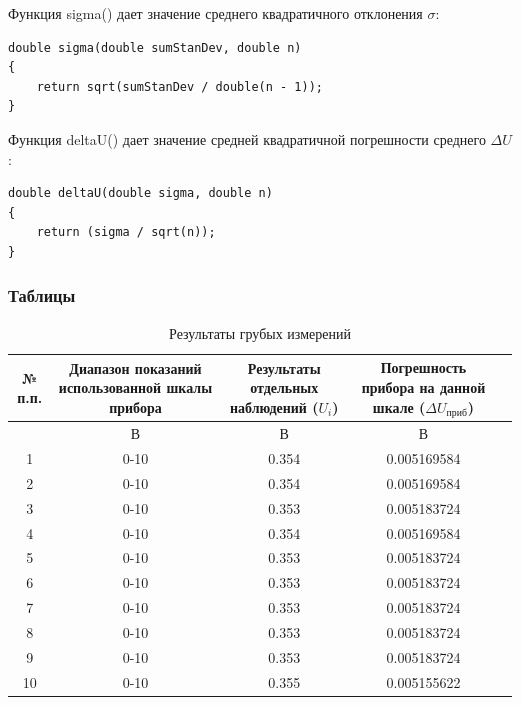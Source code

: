 Функция sigma() дает значение среднего квадратичного отклонения $\sigma$:
\begin{verbatim}
double sigma(double sumStanDev, double n)
{
	return sqrt(sumStanDev / double(n - 1));
}
\end{verbatim}

Функция deltaU() дает значение средней квадратичной
погрешности среднего $\Delta U$:
\begin{verbatim}
double deltaU(double sigma, double n)
{
	return (sigma / sqrt(n));
}
\end{verbatim}

\subsubsection{Таблицы}

\begin{center}
\begin{table}[h!]
\centering
\caption{Результаты грубых измерений}
\label{tabl:1}
\begin{tabular}{|c|c|c|c|c|}
\hline
\begin{minipage}{7mm}
    № п.п. 
\end{minipage}&
\begin{minipage}{5cm}
    Диапазон показаний использованной шкалы прибора
\end{minipage} &
\begin{minipage}{5cm}
    Результаты отдельных наблюдений ($U_i$)
\end{minipage} &
\begin{minipage}{5cm}
    Погрешность прибора на данной шкале ($\Delta U_{\text{приб}}$)
\end{minipage}\\
\hline
{}&В&В&В\\
\hline
1 &	0-10  &	0.354 & 0.005169584 \\
2 &	0-10  &	0.354 & 0.005169584 \\
3 &	0-10  &	0.353 & 0.005183724 \\
4 &	0-10  &	0.354 & 0.005169584 \\
5 & 0-10  &	0.353 & 0.005183724 \\
6 & 0-10  &	0.353 & 0.005183724 \\
7 & 0-10  &	0.353 & 0.005183724 \\
8 & 0-10  &	0.353 & 0.005183724 \\
9 & 0-10  &	0.353 & 0.005183724 \\
10& 0-10  &	0.355 & 0.005155622 \\
\hline
\end{tabular}
\end{table}
\end{center}

